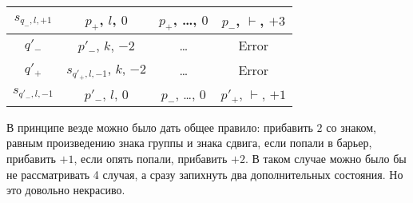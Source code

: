 \documentclass[12pt,a4paper]{article}
\begin{document}
\begin{enumproblem}
\begin{table}[H]
\begin{tabular}{c||c|c|c}
                \hline
                $s_{q_-, l, +1}$& $p_+$, $l$, $0$& $p_+$, \dots, $0$& $p_-$, $\vdash$, $+3$\\
                \hline
                \hline
                $q'_-$& $p'_-$, $k$, $-2$& \dots& Error\\
                \hline
                \hline
                $q'_+$& $s_{q'_+, l, -1}$, $k$, $-2$& \dots& Error\\
                \hline
                $s_{q'_-, l, -1}$& $p'_-$, $l$, $0$& $p_-$, \dots, $0$& $p'_+$, $\vdash$, $+1$\\
            \end{tabular}
        \end{table}
        
        В принципе везде можно было дать общее правило: прибавить $2$ со знаком, равным произведению знака группы и знака сдвига, если попали в барьер, прибавить $+1$, если опять попали, прибавить $+2$. В таком случае можно было бы не рассматривать 4 случая, а сразу запихнуть два дополнительных состояния. Но это довольно некрасиво.
    \end{enumproblem}
\end{document}
